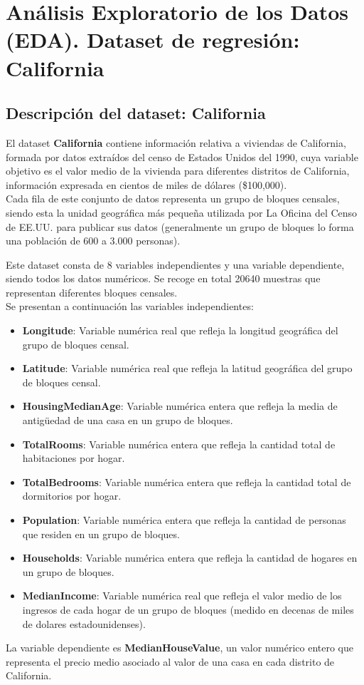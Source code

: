 \chapter{Análisis Exploratorio de los Datos (EDA). Dataset de regresión: California}

\section{Descripción del dataset: California}
El dataset \textbf{California} contiene información relativa a viviendas de California, formada por datos extraídos del censo de Estados Unidos del 1990, cuya variable objetivo es el valor medio de la vivienda para diferentes distritos de California, información expresada en cientos de miles de dólares (\$100,000). \\
Cada fila de este conjunto de datos representa un grupo de bloques censales, siendo esta la unidad geográfica más pequeña utilizada por La Oficina del Censo de EE.UU. para publicar sus datos (generalmente un grupo de bloques lo forma una población de 600 a 3.000 personas).

\vspace{0.5cm}
Este dataset consta de 8 variables independientes y una variable dependiente, siendo todos los datos numéricos. Se recoge en total 20640 muestras que representan diferentes bloques censales.\\
Se presentan a continuación las variables independientes:
\begin{itemize}
	\item \textbf{Longitude}: Variable numérica real que refleja la longitud geográfica del grupo de bloques censal.
	\item \textbf{Latitude}: Variable numérica real que refleja la latitud geográfica del grupo de bloques censal.
	\item \textbf{HousingMedianAge}: Variable numérica entera que refleja la media de antigüedad de una casa en un grupo de bloques.
	\item \textbf{TotalRooms}: Variable numérica entera que refleja la cantidad total de habitaciones por hogar.
	\item \textbf{TotalBedrooms}: Variable numérica entera que refleja la cantidad total de dormitorios por hogar.
	\item \textbf{Population}: Variable numérica entera que refleja la cantidad de personas que residen en un grupo de bloques.
	\item \textbf{Households}: Variable numérica entera que refleja la cantidad de hogares en un grupo de bloques.
	\item \textbf{MedianIncome}: Variable numérica real que refleja el valor medio de los ingresos de cada hogar de un grupo de bloques (medido en decenas de miles de dolares estadounidenses).
\end{itemize}
La variable dependiente es \textbf{MedianHouseValue}, un valor numérico entero que representa el precio medio asociado al valor de una casa en cada distrito de California. 




